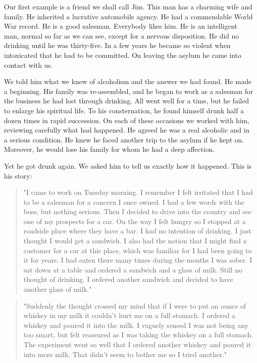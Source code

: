 Our first example is a friend we shall call Jim. 
This man has a charming wife and family. 
He inherited a lucrative automobile agency. 
He had a commendable World War record. 
He is a good salesman. 
Everybody likes him. 
He is an intelligent man, normal so far as we can see, 
except for a nervous disposition. 
He did no drinking until he was thirty-five. 
In a few years he became so violent when intoxicated that he had to be committed. 
On leaving the asylum he came into contact with us.

We told him what we knew of alcoholism and the answer we had found. 
He made a beginning. 
His family was re-assembled, 
and he began to work as a salesman for the business he had lost through drinking. 
All went well for a time, but he failed to enlarge his spiritual life. 
To his consternation, he found himself drunk half a dozen times in rapid succession. 
On each of these occasions we worked with him, reviewing carefully what had happened. 
He agreed he was a real alcoholic and in a serious condition. 
He knew he faced another trip to the asylum if he kept on. 
Moreover, he would lose his family for whom he had a deep affection.

Yet he got drunk again. 
We asked him to tell us exactly how it happened. 
This is his story: 
\begin{quote}
"I came to work on Tuesday morning. 
I remember I felt irritated that I had to be a salesman for a concern I once owned. 
I had a few words with the boss, but nothing serious. 
Then I decided to drive into the country and see one of my prospects for a car. 
On the way I felt hungry so I stopped at a roadside place where they have a bar. 
I had no intention of drinking. 
I just thought I would get a sandwich. 
I also had the notion that I might find a customer for a car at this place, 
which was familiar for I had been going to it for years. 
I had eaten there many times during the months I was sober. 
I sat down at a table and ordered a sandwich and a glass of milk. 
Still no thought of drinking. 
I ordered another sandwich and decided to have another glass of milk."
\end{quote}

\begin{quote}
"Suddenly the thought crossed my mind 
that if I were to put an ounce of whiskey in my milk 
it couldn't hurt me on a full stomach. 
I ordered a whiskey and poured it into the milk. 
I vaguely sensed I was not being any too smart, 
but felt reassured as I was taking the whiskey on a full stomach. 
The experiment went so well that I ordered another whiskey 
and poured it into more milk. 
That didn't seem to bother me so I tried another."
\end{quote}


